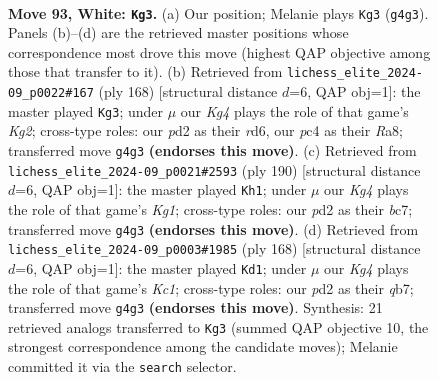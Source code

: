 \documentclass[11pt]{article}
\begin{document}
\clearpage

\begin{figure}[p]\centering
\begin{subfigure}{0.46\textwidth}\centering
\resizebox{\linewidth}{!}{%
\newchessgame
\chessboard[
  setfen={8/8/8/8/2p1k1K1/8/p2p4/8 w - - 0 93},
  showmover=false,
  pgfstyle=straightmove, color=movearrow, markmove={g4-g3}
]}
\caption{}
\end{subfigure}\hfill
\begin{subfigure}{0.46\textwidth}\centering
\resizebox{\linewidth}{!}{%
\newchessgame
\chessboard[
  setfen={R7/8/3r4/8/4p3/8/4k1K1/8 w - - 32 85},
  showmover=false,
  pgfstyle=straightmove, color=movearrow, markmove={g2-g3}
]}
\caption{}
\end{subfigure}
\\[4pt]
\begin{subfigure}{0.46\textwidth}\centering
\resizebox{\linewidth}{!}{%
\newchessgame
\chessboard[
  setfen={8/2b5/7p/8/8/7k/8/6K1 w - - 24 96},
  showmover=false,
  pgfstyle=straightmove, color=movearrow, markmove={g1-h1}
]}
\caption{}
\end{subfigure}\hfill
\begin{subfigure}{0.46\textwidth}\centering
\resizebox{\linewidth}{!}{%
\newchessgame
\chessboard[
  setfen={8/1q6/8/8/8/3k2p1/8/2K5 w - - 0 85},
  showmover=false,
  pgfstyle=straightmove, color=movearrow, markmove={c1-d1}
]}
\caption{}
\end{subfigure}
\caption{\textbf{Move 93, White: \texttt{Kg3}.} (a) Our position; Melanie plays \texttt{Kg3} (\texttt{g4g3}). Panels (b)--(d) are the retrieved master positions whose correspondence most drove this move (highest QAP objective among those that transfer to it). (b) Retrieved from \texttt{lichess\_elite\_2024-09\_p0022\#167} (ply 168) [structural distance $d$=6, QAP obj=1]: the master played \texttt{Kg3}; under $\mu$ our \emph{Kg4} plays the role of that game's \emph{Kg2}; cross-type roles: our \emph{p}d2 as their \emph{r}d6, our \emph{p}c4 as their \emph{R}a8; transferred move \texttt{g4g3} \textbf{(endorses this move)}. (c) Retrieved from \texttt{lichess\_elite\_2024-09\_p0021\#2593} (ply 190) [structural distance $d$=6, QAP obj=1]: the master played \texttt{Kh1}; under $\mu$ our \emph{Kg4} plays the role of that game's \emph{Kg1}; cross-type roles: our \emph{p}d2 as their \emph{b}c7; transferred move \texttt{g4g3} \textbf{(endorses this move)}. (d) Retrieved from \texttt{lichess\_elite\_2024-09\_p0003\#1985} (ply 168) [structural distance $d$=6, QAP obj=1]: the master played \texttt{Kd1}; under $\mu$ our \emph{Kg4} plays the role of that game's \emph{Kc1}; cross-type roles: our \emph{p}d2 as their \emph{q}b7; transferred move \texttt{g4g3} \textbf{(endorses this move)}. Synthesis: 21 retrieved analogs transferred to \texttt{Kg3} (summed QAP objective 10, the strongest correspondence among the candidate moves); Melanie committed it via the \texttt{search} selector.}
\label{fig:thought-m184}
\end{figure}
\end{document}
